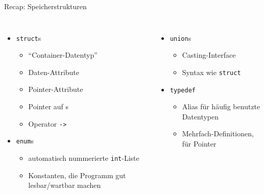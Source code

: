 
\begin{frame}[t,plain]
\titlepage
\end{frame}


\begin{frame}{Recap: Speicherstrukturen}
%
\begin{columns}[T]
\begin{itemize}
\item \texttt{struct}s
	\begin{itemize}
	\item \enquote{Container-Datentyp}
	\item Daten-Attribute
	\item Pointer-Attribute
	\item Pointer auf s
	\item Operator \texttt{->}
	\end{itemize}
\item \texttt{enum}s
	\begin{itemize}
	\item automatisch nummerierte \texttt{int}-Liste
	\item Konstanten, die Programm gut lesbar/wartbar machen
	\end{itemize}
\end{itemize}
%
\begin{itemize}
\item \texttt{union}s
	\begin{itemize}
	\item Casting-Interface
	\item Syntax wie \texttt{struct}
	\end{itemize}
\item \texttt{typedef}
	\begin{itemize}
	\item Alias für häufig benutzte Datentypen
	\item Mehrfach-Definitionen, \zB für Pointer
	\end{itemize}
\end{itemize}
\end{columns}
%
\end{frame}


